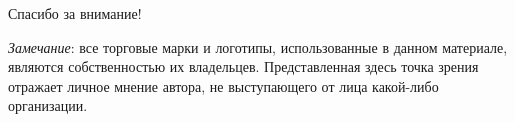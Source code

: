 \begin{frame}

{\huge{Спасибо за внимание!}\par}

\vfill

\tiny{\textit{Замечание}: все торговые марки и логотипы, использованные в данном материале, являются собственностью их владельцев. Представленная здесь точка зрения отражает личное мнение автора, не выступающего от лица какой-либо организации.}

\end{frame}


